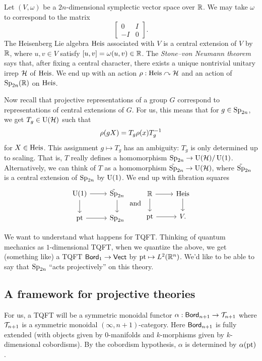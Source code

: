 \documentclass{article}
\begin{document}
Let $(V, \omega)$ be a $2n$-dimensional symplectic vector space over $\mathbb{R}$.
We may take $\omega$ to correspond to the matrix
\[
\begin{bmatrix}
0 & I \\
-I & 0
\end{bmatrix}.
\]
The Heisenberg Lie algebra $\operatorname{Heis}$ associated with $V$ is a central extension of $V$ by $\mathbb{R}$, where $u, v \in V$ satisfy $[u, v] = \omega(u, v) \in \mathbb{R}$.
The \emph{Stone--von Neumann theorem} says that, after fixing a central character, there exists a unique nontrivial unitary irrep $\mathcal{H}$ of $\operatorname{Heis}$.
We end up with an action $\rho: \operatorname{Heis} \curvearrowright \mathcal{H}$ and an action of $\operatorname{Sp}_{2n}(\mathbb{R})$ on $\operatorname{Heis}$.

Now recall that projective representations of a group $G$ correspond to representations of central extensions of $G$.
For us, this means that for $g \in \operatorname{Sp}_{2n}$, we get $T_g \in \operatorname{U}(\mathcal{H})$ such that
\[
  \rho(gX) = T_g \rho(x) T_g^{-1}
\]
for $X \in \operatorname{Heis}$.
This assignment $g \mapsto T_g$ has an ambiguity: $T_g$ is only determined up to scaling.
That is, $T$ really defines a homomorphism $\operatorname{Sp}_{2n} \to \operatorname{U}(\mathcal{H}) / \operatorname{U}(1)$.
Alternatively, we can think of $T$ as a homomorphism $\tilde{\operatorname{Sp}}_{2n} \to \operatorname{U}(\mathcal{H})$, where $\tilde{\operatorname{Sp}}_{2n}$ is a central extension of $\operatorname{Sp}_{2n}$ by $\operatorname{U}(1)$.
We end up with fibration squares
\[
  \begin{tikzcd}
    \Urm(1) \rar \dar & \tilde{\Sp}_{2n} \dar \\
    \pt \rar & \Sp_{2n}
  \end{tikzcd}
  \textrm{ and }
  \begin{tikzcd}
    \RR \rar \dar & \Heis \dar \\
    \pt \rar & V.
  \end{tikzcd}
\]

We want to understand what happens for TQFT.
Thinking of quantum mechanics as $1$-dimensional TQFT, when we quantize the above, we get (something like) a TQFT $\mathsf{Bord}_1 \to \mathsf{Vect}$ by $\operatorname{pt} \mapsto L^2(\mathbb{R}^n)$.
We'd like to be able to say that $\operatorname{Sp}_{2n}$ ``acts projectively'' on this theory.

\subsection{A framework for projective theories}

For us, a TQFT will be a symmetric monoidal functor $\alpha: \mathsf{Bord}_{n+1} \to \mathcal{T}_{n+1}$ where $\mathcal{T}_{n+1}$ is a symmetric monoidal $(\infty, n+1)$-category.
Here $\mathsf{Bord}_{n+1}$ is fully extended (with objects given by $0$-manifolds and $k$-morphisms given by $k$-dimensional cobordisms).
By the cobordism hypothesis, $\alpha$ is determined by $\alpha(\operatorname{pt})$.
\end{document}
